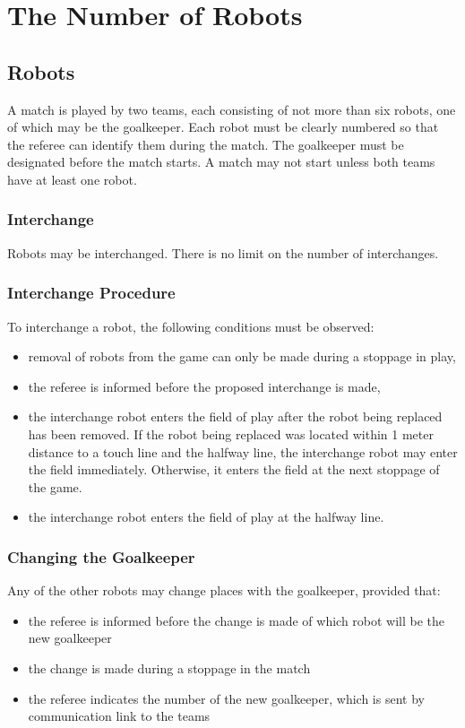 \section{The Number of Robots}\label{sec:number-of-robots}

\subsection{Robots}
A match is played by two teams, each consisting of not more than six robots, one of which may be the goalkeeper.
Each robot must be clearly numbered so that the referee can identify them during the match.
The goalkeeper must be designated before the match starts.
A match may not start unless both teams have at least one robot.

\subsubsection{Interchange}\label{subsubsec:number-of-robots-interchange}
Robots may be interchanged.
There is no limit on the number of interchanges.

\subsubsection{Interchange Procedure}
To interchange a robot, the following conditions must be observed:
\begin{itemize}
\item removal of robots from the game can only be made during a stoppage in play,
\item the referee is informed before the proposed interchange is made,
\item the interchange robot enters the field of play after the robot being replaced has been removed.
If the robot being replaced was located within 1 meter distance to a touch line and the halfway line, the interchange robot may enter the field immediately. Otherwise, it enters the field at the next stoppage of the game.
\item the interchange robot enters the field of play at the halfway line.
\end{itemize}

\subsubsection{Changing the Goalkeeper}
Any of the other robots may change places with the goalkeeper, provided that:
\begin{itemize}
\item the referee is informed before the change is made of which robot will be the new goalkeeper
\item the change is made during a stoppage in the match
\item the referee indicates the number of the new goalkeeper, which is sent by communication link to the teams
\end{itemize}

